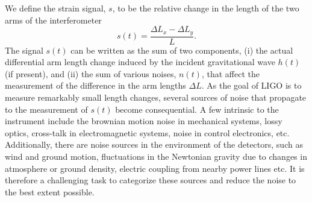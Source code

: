We define the strain signal, $s$, to be the relative change in the length 
of the two arms of the interferometer
% 
\begin{equation}
 s(t) = \dfrac{\Delta L_x - \Delta L_y}{L}.
\end{equation}
% 
The signal $s(t)$ can be written as the sum of two components, (i) the actual
differential arm length change induced by the incident gravitational wave 
$h(t)$ (if present), and (ii) the sum of various noises, $n(t)$, that affect 
the measurement of the difference in the arm lengths $\Delta L$. 
%
As the goal of LIGO is to measure remarkably small length changes, several
sources of noise that propagate to the measurement of $s(t)$ become 
consequential. A few intrinsic to the instrument include the brownian motion
noise in mechanical systems, lossy optics, cross-talk in electromagnetic
systems, noise in control electronics, etc. Additionally, there are noise 
sources in the environment of the detectors, such as wind and ground motion,
fluctuations in the Newtonian gravity due to changes in atmosphere or ground
density, electric coupling from nearby power lines etc. 
%
It is therefore a challenging task to categorize these sources and reduce the
noise to the best extent possible.


